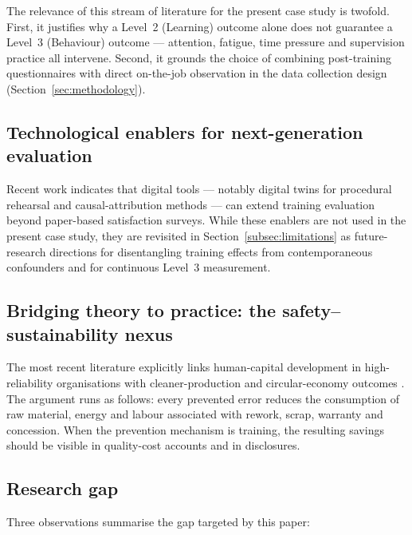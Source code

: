 The relevance of this stream of literature for the present case study is
twofold. First, it justifies why a Level~2 (Learning) outcome alone does not
guarantee a Level~3 (Behaviour) outcome --- attention, fatigue, time pressure
and supervision practice all intervene. Second, it grounds the choice of
combining post-training questionnaires with direct on-the-job observation in
the data collection design (Section~\ref{sec:methodology}).

\subsection{Technological enablers for next-generation evaluation}
\label{subsec:tech-enablers}

Recent work indicates that digital tools --- notably digital twins for
procedural rehearsal \citep{Garcia2024} and causal-attribution methods
\citep{Fernandez2024} --- can extend training evaluation beyond
paper-based satisfaction surveys. While these enablers are not used in
the present case study, they are revisited in
Section~\ref{subsec:limitations} as future-research directions for
disentangling training effects from contemporaneous confounders and for
continuous Level~3 measurement.

\subsection{Bridging theory to practice: the safety--sustainability nexus}
\label{subsec:bridge}

The most recent literature explicitly links human-capital development in
high-reliability organisations with cleaner-production and circular-economy
outcomes \citep{Sousa2025,Yang2024,Chen2023}. The argument runs as follows:
every prevented error reduces the consumption of raw material, energy and
labour associated with rework, scrap, warranty and concession. When the
prevention mechanism is training, the resulting savings should be visible in
quality-cost accounts and in \ESG{} disclosures.

\subsection{Research gap}
\label{subsec:gap}

Three observations summarise the gap targeted by this paper:

